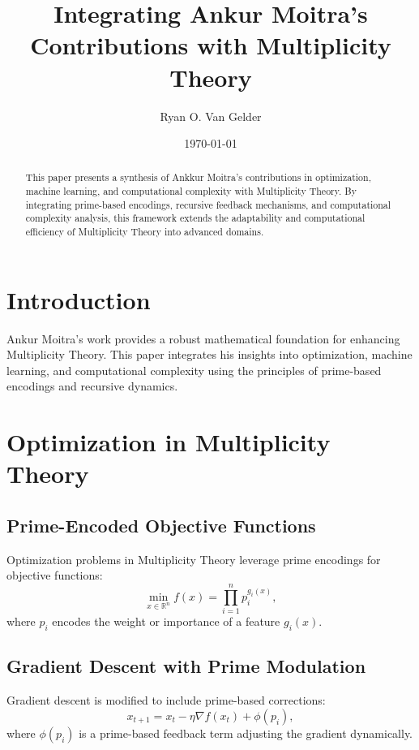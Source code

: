 \documentclass{article}
\theoremstyle{plain}
\begin{document}
\title{Integrating Ankur Moitra's Contributions with Multiplicity Theory}
\author{Ryan O. Van Gelder}
\date{\today}

\maketitle

\begin{abstract}
This paper presents a synthesis of Ankkur Moitra’s contributions in optimization, machine learning, and computational complexity with Multiplicity Theory. By integrating prime-based encodings, recursive feedback mechanisms, and computational complexity analysis, this framework extends the adaptability and computational efficiency of Multiplicity Theory into advanced domains.
\end{abstract}

\section{Introduction}
Ankur Moitra’s work provides a robust mathematical foundation for enhancing Multiplicity Theory. This paper integrates his insights into optimization, machine learning, and computational complexity using the principles of prime-based encodings and recursive dynamics.

\section{Optimization in Multiplicity Theory}

\subsection{Prime-Encoded Objective Functions}
Optimization problems in Multiplicity Theory leverage prime encodings for objective functions:
\begin{equation}
    \min_{x \in \mathbb{R}^n} f(x) = \prod_{i=1}^n p_i^{g_i(x)},
\end{equation}
where \(p_i\) encodes the weight or importance of a feature \(g_i(x)\).

\subsection{Gradient Descent with Prime Modulation}
Gradient descent is modified to include prime-based corrections:
\begin{equation}
    x_{t+1} = x_t - \eta \nabla f(x_t) + \phi(p_i),
\end{equation}
where \(\phi(p_i)\) is a prime-based feedback term adjusting the gradient dynamically.
\end{document}
